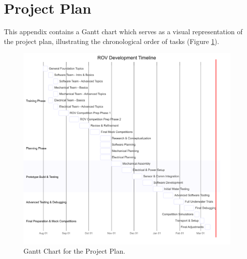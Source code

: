 \section{Project Plan} \label{app:project_plan}

This appendix contains a Gantt chart which serves as a visual representation of the project plan, illustrating the chronological order of tasks (Figure \ref{fig:project_plan}).

\begin{figure}[h!]
    \centering
    \includegraphics[width=0.7\columnwidth]{Sections/7Appendicies/images/Project Plan.png}
    \caption{Gantt Chart for the Project Plan.}
    \label{fig:project_plan}
\end{figure}
